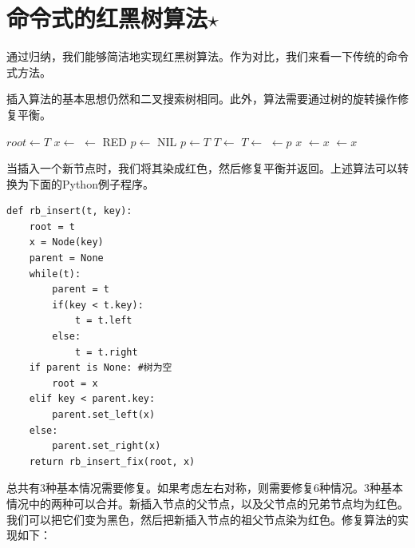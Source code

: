 \documentclass[b5paper]{ctexart}
\begin{document}
\section{命令式的红黑树算法$\star$}

通过归纳，我们能够简洁地实现红黑树算法。作为对比，我们来看一下传统的命令式方法。

插入算法的基本思想仍然和二叉搜索树相同。此外，算法需要通过树的旋转操作修复平衡。

\begin{algorithmic}[1]
  \State $root \gets T$
  \State $x \gets$ 
  \State {} $\gets$ RED
  \State $p \gets$ NIL
    \State $p \gets T$
      \State $T \gets $ 
    \Else
      \State $T \gets $ 
    \EndIf
  \EndWhile
  \State {} $\gets p$
   
    \State \Return $x$
    \State {} $\gets x$
  \Else
    \State {} $\gets x$
  \EndIf
  \State \Return {}
\EndFunction
\end{algorithmic}

当插入一个新节点时，我们将其染成红色，然后修复平衡并返回。上述算法可以转换为下面的Python例子程序。

\lstset{language=Python}
\begin{lstlisting}
def rb_insert(t, key):
    root = t
    x = Node(key)
    parent = None
    while(t):
        parent = t
        if(key < t.key):
            t = t.left
        else:
            t = t.right
    if parent is None: #树为空
        root = x
    elif key < parent.key:
        parent.set_left(x)
    else:
        parent.set_right(x)
    return rb_insert_fix(root, x)
\end{lstlisting}

总共有3种基本情况需要修复。如果考虑左右对称，则需要修复6种情况。3种基本情况中的两种可以合并。新插入节点的父节点，以及父节点的兄弟节点均为红色。我们可以把它们变为黑色，然后把新插入节点的祖父节点染为红色。修复算法的实现如下：
\end{document}
